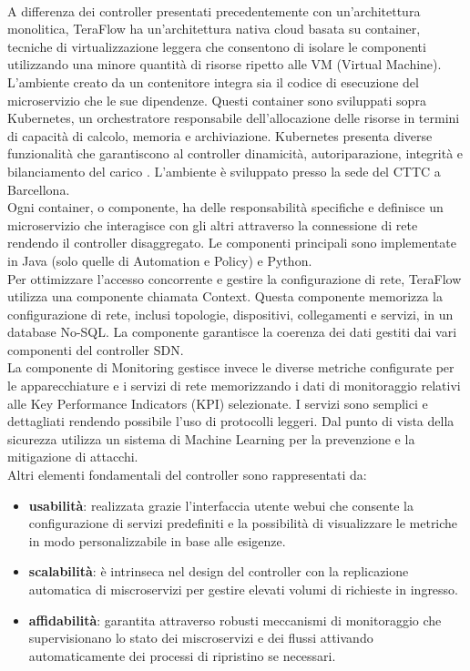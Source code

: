 \\A differenza dei controller presentati precedentemente con un'architettura monolitica, TeraFlow ha un'architettura nativa cloud basata su container, tecniche di virtualizzazione leggera che consentono di isolare le componenti utilizzando una minore quantità di risorse ripetto alle VM (Virtual Machine).
L'ambiente creato da un contenitore integra sia il codice di esecuzione del microservizio che le sue dipendenze. 
Questi container sono sviluppati sopra Kubernetes, un orchestratore responsabile dell'allocazione delle risorse in termini di capacità di calcolo, memoria e archiviazione\cite{arttfs}.
Kubernetes presenta diverse funzionalità che garantiscono al controller dinamicità, autoriparazione, integrità e bilanciamento del carico \cite{D53} \cite{D14}.
L'ambiente è sviluppato presso la sede del CTTC a Barcellona. 
\\Ogni container, o componente, ha delle responsabilità specifiche e definisce un microservizio che interagisce con gli altri attraverso la connessione di rete rendendo il controller disaggregato.
Le componenti principali sono implementate in Java (solo quelle di Automation e Policy) e Python.
\\Per ottimizzare l'accesso concorrente e gestire la configurazione di rete, TeraFlow utilizza una componente chiamata Context. Questa componente memorizza la configurazione di rete, inclusi topologie, dispositivi, 
collegamenti e servizi, in un database No-SQL\cite{D31}. La componente garantisce la coerenza dei dati gestiti dai vari componenti del controller SDN.
\\La componente di Monitoring gestisce invece le diverse metriche configurate per le apparecchiature e i servizi di rete memorizzando i dati di monitoraggio relativi alle Key Performance Indicators (KPI) selezionate.
I servizi sono semplici e dettagliati rendendo possibile l'uso di protocolli leggeri.
Dal punto di vista della sicurezza utilizza un sistema di Machine Learning per la prevenzione e la mitigazione di attacchi.
\\Altri elementi fondamentali del controller sono rappresentati da\cite{D22}:
\begin{itemize} 
    \item \textbf{usabilità}: realizzata grazie l'interfaccia utente webui che consente la configurazione di servizi predefiniti e la possibilità di visualizzare le metriche in modo personalizzabile in base alle esigenze.
    \item \textbf{scalabilità}: è intrinseca nel design del controller con la replicazione automatica di miscroservizi per gestire elevati volumi di richieste in ingresso.
    \item \textbf{affidabilità}: garantita attraverso robusti meccanismi di monitoraggio che supervisionano lo stato dei miscroservizi e dei flussi attivando automaticamente dei processi di ripristino se necessari.
\end{itemize}
